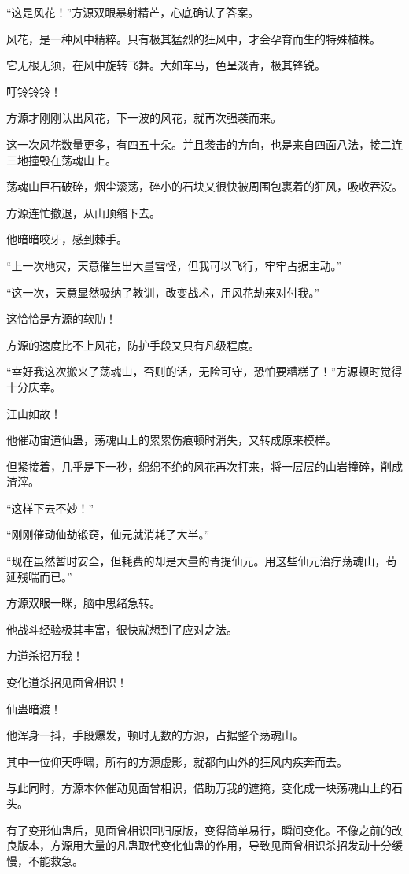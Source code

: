 \begin{this_body}
“这是风花！”方源双眼暴射精芒，心底确认了答案。

风花，是一种风中精粹。只有极其猛烈的狂风中，才会孕育而生的特殊植株。

它无根无须，在风中旋转飞舞。大如车马，色呈淡青，极其锋锐。

叮铃铃铃！

方源才刚刚认出风花，下一波的风花，就再次强袭而来。

这一次风花数量更多，有四五十朵。并且袭击的方向，也是来自四面八法，接二连三地撞毁在荡魂山上。

荡魂山巨石破碎，烟尘滚荡，碎小的石块又很快被周围包裹着的狂风，吸收吞没。

方源连忙撤退，从山顶缩下去。

他暗暗咬牙，感到棘手。

“上一次地灾，天意催生出大量雪怪，但我可以飞行，牢牢占据主动。”

“这一次，天意显然吸纳了教训，改变战术，用风花劫来对付我。”

这恰恰是方源的软肋！

方源的速度比不上风花，防护手段又只有凡级程度。

“幸好我这次搬来了荡魂山，否则的话，无险可守，恐怕要糟糕了！”方源顿时觉得十分庆幸。

江山如故！

他催动宙道仙蛊，荡魂山上的累累伤痕顿时消失，又转成原来模样。

但紧接着，几乎是下一秒，绵绵不绝的风花再次打来，将一层层的山岩撞碎，削成渣滓。

“这样下去不妙！”

“刚刚催动仙劫锻窍，仙元就消耗了大半。”

“现在虽然暂时安全，但耗费的却是大量的青提仙元。用这些仙元治疗荡魂山，苟延残喘而已。”

方源双眼一眯，脑中思绪急转。

他战斗经验极其丰富，很快就想到了应对之法。

力道杀招万我！

变化道杀招见面曾相识！

仙蛊暗渡！

他浑身一抖，手段爆发，顿时无数的方源，占据整个荡魂山。

其中一位仰天呼啸，所有的方源虚影，就都向山外的狂风内疾奔而去。

与此同时，方源本体催动见面曾相识，借助万我的遮掩，变化成一块荡魂山上的石头。

有了变形仙蛊后，见面曾相识回归原版，变得简单易行，瞬间变化。不像之前的改良版本，方源用大量的凡蛊取代变化仙蛊的作用，导致见面曾相识杀招发动十分缓慢，不能救急。


\end{this_body}

